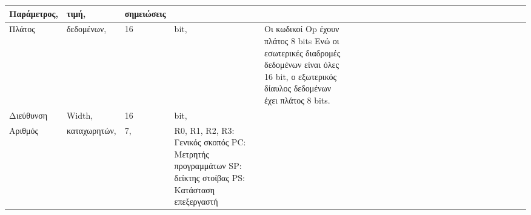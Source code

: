 \documentclass[11pt,a4paper,notitlepage,fleqn]{article}
\begin{document}
\begin{table}[h]
	\begin{tabular}{|l|l|l|l|l|l|l|l|l|l|l|l|l|l|l|l|l|l|l|l|l|l|l|l|l|l|}
		\hline
		\textbf{Παράμετρος}, & \textbf{τιμή},        & \textbf{σημειώσεις}         &                                                                                                        &                                                                                                                                               &                                                                                                                                                                     &             &         &         &            &         &             &                 &          &            &          &      &         &       &         &     &         &       &        &    &             \\ \hline
		Πλάτος      & δεδομένων,   & 16                 & bit,                                                                                                   & Οι κωδικοί Op έχουν πλάτος 8 bits Ενώ οι εσωτερικές διαδρομές δεδομένων είναι όλες 16 bit, ο εξωτερικός δίαυλος δεδομένων έχει πλάτος 8 bits. &                                                                                                                                                                     &             &         &         &            &         &             &                 &          &            &          &      &         &       &         &     &         &       &        &    &             \\ \hline
		Διεύθυνση   & Width,       & 16                 & bit,                                                                                                   &                                                                                                                                               &                                                                                                                                                                     &             &         &         &            &         &             &                 &          &            &          &      &         &       &         &     &         &       &        &    &             \\ \hline
		Αριθμός     & καταχωρητών, & 7,                 & R0, R1, R2, R3: Γενικός σκοπός PC: Μετρητής προγραμμάτων SP: δείκτης στοίβας PS: Κατάσταση επεξεργαστή &                                                                                                                                               &                                                                                                                                                                     &             &         &         &            &         &             &                 &          &            &          &      &         &       &         &     &         &       &        &    &             \\ \hline

\end{tabular}
\end{table}
\end{document}
